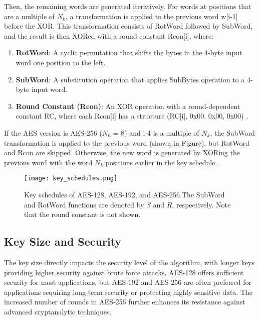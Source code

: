 Then, the remaining words are generated iteratively. For words at positions that are a multiple of $N_k$, a 
transformation is applied to the previous word w[i-1] before the XOR. This transformation consists of RotWord 
followed by SubWord, and the result is then XORed with a round constant Rcon[i], where:

\begin{enumerate}
    \item \textbf{RotWord}: A cyclic permutation that shifts the bytes in the 4-byte input word one position to the left. 
    \item \textbf{SubWord}: A substitution operation that applies SubBytes operation to a 4-byte input word. 
    \item \textbf{Round Constant (Rcon)}:  An XOR operation with a round-dependent constant RC, where each Rcon[i]
    has a structure (RC[i], 0x00, 0x00, 0x00) \cite{NIST_AES}. 
\end{enumerate}

If the AES version is AES-256 ($N_k$ = 8) and i-4 is a multiple of $N_k$, the SubWord transformation is applied to the 
previous word (shown in Figure), but RotWord and Rcon are skipped. Otherwise, the new word is generated by XORing the previous word 
with the word $N_k$ positions earlier in the key schedule \cite{NIST_AES}. 

\begin{figure}[h] %
    \centering
    \texttt{[image: key\_schedules.png]} %
    \caption{
        Key schedules of AES-128, AES-192, and AES-256.The SubWord and
        RotWord functions are denoted by $S$ and $R$, respectively. Note that the round
        constant is not shown. \cite{Key_Collisions}
    }
    \label{fig:key_comb} %
\end{figure}

\subsection{Key Size and Security}

The key size directly impacts the security level of the algorithm, with 
longer keys providing higher security against brute force attacks. AES-128 offers sufficient security 
for most applications, but AES-192 and AES-256 are often preferred for applications requiring 
long-term security or protecting highly sensitive data. The increased number of rounds in AES-256 
further enhances its resistance against advanced cryptanalytic techniques.

